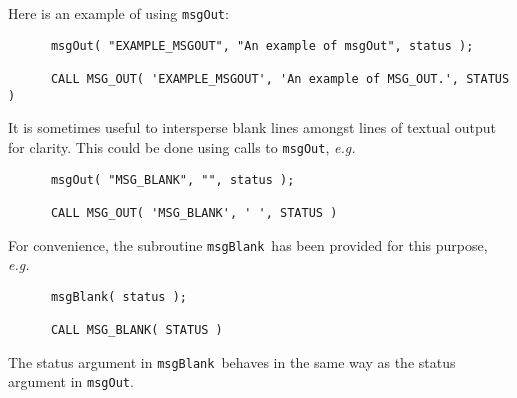 \documentclass[twoside,11pt]{article}
\renewcommand{\_}{\texttt{\symbol{95}}}
\newcommand{\func}[1]{\texttt{#1}}
\newcommand{\msgblank}{\func{msgBlank}}
\newcommand{\msgout}{\func{msgOut}}
\begin{document}
Here is an example of using \msgout:
\begin {small}
\begin{verbatim}
      msgOut( "EXAMPLE_MSGOUT", "An example of msgOut", status );

      CALL MSG_OUT( 'EXAMPLE_MSGOUT', 'An example of MSG_OUT.', STATUS )
\end{verbatim}
\end {small}
It is sometimes useful to intersperse blank lines amongst lines of textual
output for clarity.
This could be done using calls to \msgout, \textit{e.g.}
\begin {small}
\begin{verbatim}
      msgOut( "MSG_BLANK", "", status );

      CALL MSG_OUT( 'MSG_BLANK', ' ', STATUS )
\end{verbatim}
\end {small}
For convenience, the subroutine \msgblank\ has been provided for this
purpose, \textit{e.g.}
\begin {small}
\begin{verbatim}
      msgBlank( status );

      CALL MSG_BLANK( STATUS )
\end{verbatim}
\end {small}
The status argument in \msgblank\ behaves in the same way as the status
argument in \msgout.
\end{document}
